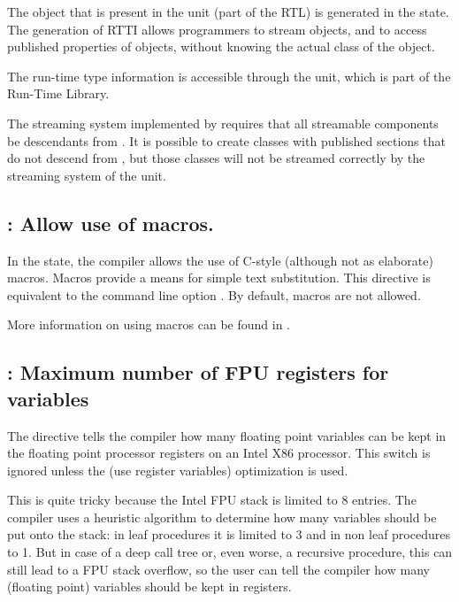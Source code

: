 The  object that is present in the  unit 
(part of the RTL) is generated in the  state. The generation 
of RTTI allows programmers to stream objects, and to access published 
properties of objects, without knowing the actual class of the object.

The run-time type information is accessible through the  unit,
which is part of the \fpc Run-Time Library.

\begin{remark}
The streaming system implemented by \fpc requires that all
streamable components be descendants from . It is possible
to create classes with published sections that do not descend from
, but those classes will not be streamed correctly by the
streaming system of the  unit. 
\end{remark}

\subsection{ : Allow use of macros.}

In the  state, the compiler allows the use of C-style
(although not as elaborate) macros. Macros provide a means for simple text
substitution. This directive is equivalent to the command line option .
By default, macros are not allowed.

More information on using macros can be found in . 


\subsection{ : Maximum number of FPU registers for variables}

The  directive tells the compiler how many floating point
variables can be kept in the floating point processor registers on an Intel
X86 processor. This switch is ignored unless the  (use register variables) 
optimization is used.

This is quite tricky because the Intel FPU stack is limited to 8 entries.
The compiler uses a heuristic algorithm to determine how many variables should be
put onto the stack: in leaf procedures it is limited to 3 and in non leaf
procedures to 1. But in case of a deep call tree or, even worse, a recursive
procedure, this can still lead to a FPU stack overflow, so the user can tell
the compiler how many (floating point) variables should be kept in registers.

